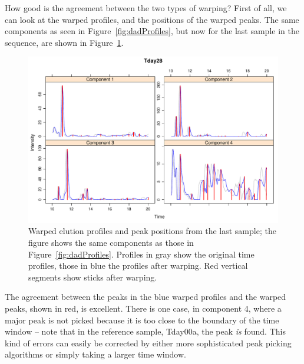 \documentclass[a4paper,11pt]{article}
\begin{document}
How good is the agreement between the two types of warping? First of
all, we can look at the warped profiles, and the positions of the
warped peaks. The same components as seen in
Figure~\ref{fig:dadProfiles}, but now for the last sample in the
sequence, are shown in Figure~\ref{fig:warpedProfiles}.
\begin{figure}[tb]
  \centering
\includegraphics{stickPTW-009}
\caption{Warped elution profiles and peak positions from the last
  sample; the figure shows the same components as those in
  Figure~\protect\ref{fig:dadProfiles}. Profiles in gray show the
  original time profiles, those in blue the profiles after
  warping. Red vertical segments show sticks after warping.}
\label{fig:warpedProfiles}
\end{figure}
The agreement between the peaks in the blue warped profiles and the
warped peaks, shown in red, is excellent. There is one case, in
component 4, where a major peak is not picked because it is too close
to the boundary of the time window -- note that in the reference
sample, Tday00a, the peak \emph{is} found. This kind of errors can
easily be corrected by either more sophisticated peak picking
algorithms or simply taking a larger time window.
\end{document}
